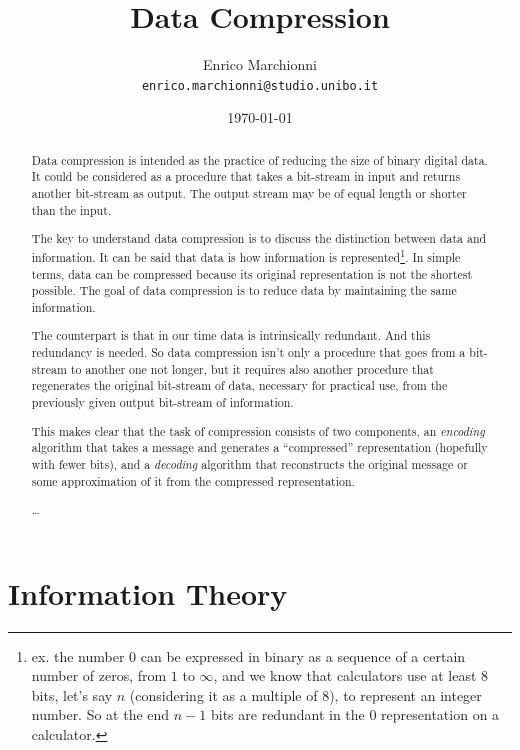 \documentclass[12pt, a4paper]{report}
\title{
  Data Compression
}
\author{
  Enrico Marchionni\\
  \texttt{enrico.marchionni@studio.unibo.it}
}
\date{\today}
\begin{document}
\maketitle

\begin{abstract}

Data compression is intended as the practice of reducing the size of binary digital data.
It could be considered as a procedure that takes a bit-stream in input and returns another bit-stream as output.
The output stream may be of equal length or shorter than the input.

The key to understand data compression is to discuss the distinction between data and information.
It can be said that data is how information is represented\footnote{ex. the number 0 can be expressed in binary as a sequence of a
certain number of zeros, from \(1\) to \(\infty\), and we know that calculators use at least 8 bits, let's say \(n\)
(considering it as a multiple of 8), to represent an integer number. So at the end \(n - 1\) bits are redundant in the 0
representation on a calculator.}. In simple terms, data can be compressed because its original representation is not the shortest
possible. The goal of data compression is to reduce data by maintaining the same information.

The counterpart is that in our time data is intrinsically redundant. And this redundancy is needed.
So data compression isn't only a procedure that goes from a bit-stream to another one not longer, but it requires also another
procedure that regenerates the original bit-stream of data, necessary for practical use, from the previously given output
bit-stream of information.

This makes clear that the task of compression consists of two components, an \textit{encoding} algorithm that takes a message
and generates a “compressed” representation (hopefully with fewer bits), and a \textit{decoding} algorithm that reconstructs
the original message or some approximation of it from the compressed representation.

\dots %

\end{abstract}

\tableofcontents

\chapter{Information Theory}
\end{document}

